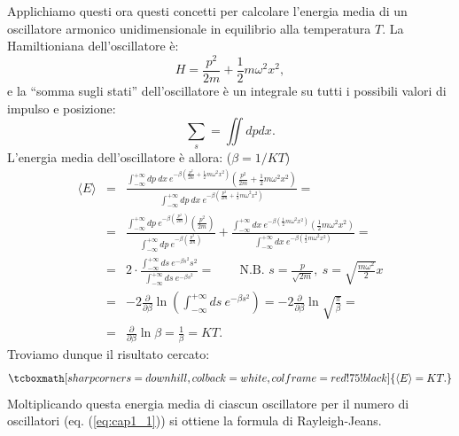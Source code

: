 \documentclass[a4paper,12pt,oneside]{book}
\begin{document}
Applichiamo questi ora questi concetti per calcolare l'energia media di un oscillatore armonico unidimensionale in equilibrio alla temperatura $T$. La Hamiltioniana dell'oscillatore è:
	\begin{equation}
		H= \frac{p^2}{2m}+\frac{1}{2}m \omega ^2 x^2 , 
	\end{equation}
e la ``somma sugli stati'' dell'oscillatore è un integrale su tutti i possibili valori di impulso e posizione:
	\begin{equation}
		\sum _s = \iint dp dx .
	\end{equation}
L'energia media dell'oscillatore è allora: ($\beta = 1/KT$)
	\begin{eqnarray}
		\langle E \rangle &=& \frac{\int _{-\infty} ^{+\infty} dp\ dx \ e^{-\beta \left( \frac{p^2}{2m}+\frac{1}{2}m \omega ^2x^2\right)}\left( \frac{p^2}{2m}+\frac{1}{2}m \omega ^2x^2\right)}{\int _{-\infty} ^{+\infty} dp\ dx\ e^{-\beta \left( \frac{p^2}{2m}+\frac{1}{2}m \omega ^2x^2\right)}}= \nonumber \\
		&=&\frac{\int _{-\infty} ^{+\infty} dp \ e^{-\beta \left( \frac{p^2}{2m}\right)}\left( \frac{p^2}{2m}\right)}{\int _{-\infty} ^{+\infty} dp \  e^{-\beta \left( \frac{p^2}{2m}\right)}} + \frac{\int _{-\infty} ^{+\infty}  dx \  e^{-\beta \left(\frac{1}{2}m \omega ^2x^2\right)}\left(\frac{1}{2}m \omega ^2x^2\right)}{\int _{-\infty} ^{+\infty} dx\ e^{-\beta \left( \frac{1}{2}m \omega ^2x^2\right)}}= \nonumber \\
		&=& 2\cdot \frac{\int _{-\infty} ^{+\infty}ds \  e^{-\beta s^2}s^2}{\int _{-\infty} ^{+\infty}ds \  e^{-\beta s^2}}= \qquad \scriptstyle{\textrm{N.B. } s=\frac{p}{\sqrt{2m}}, \ s= \sqrt{\frac{m \omega ^2}{2}}x}\nonumber \\
		&=&-2 \frac{\partial}{\partial \beta} \ln \left(\int _{-\infty} ^{+\infty}ds \  e^{-\beta s^2} \right) = -2\frac{\partial}{\partial \beta} \ln \sqrt{\frac{\pi}{\beta}}= \nonumber \\
	&=& \frac{\partial}{\partial \beta} \ln \beta = \frac{1}{\beta}= KT. 
	\end{eqnarray}
Troviamo dunque il risultato cercato:
	\begin{equation}
	\tcboxmath[sharp corners=downhill ,colback=white,colframe=red!75!black]{
			\langle E \rangle = KT.
	}
	\label{eq:cap1_2}
\end{equation}
Moltiplicando questa energia media di ciascun oscillatore per il numero di oscillatori (eq. (\ref{eq:cap1_1})) si ottiene la formula di Rayleigh-Jeans.\\
\end{document}
